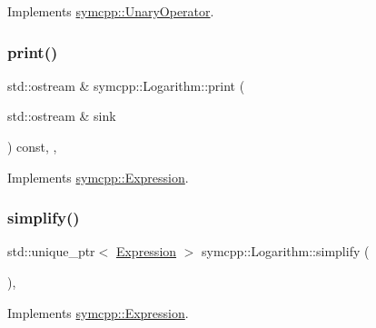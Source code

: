 Implements \mbox{\hyperlink{classsymcpp_1_1UnaryOperator_a85de3214870cd72edc63ac1c221ddeee}{symcpp\+::\+Unary\+Operator}}.

\mbox{\label{classsymcpp_1_1Logarithm_a336bed1a474b338eabd6a258d527b65b}} 
\subsubsection{\texorpdfstring{print()}{print()}}
{\footnotesize\ttfamily std\+::ostream \& symcpp\+::\+Logarithm\+::print (\begin{DoxyParamCaption}\item[{std\+::ostream \&}]{sink }\end{DoxyParamCaption}) const\hspace{0.3cm}{\ttfamily [override]}, {\ttfamily [private]}, {\ttfamily [virtual]}}



Implements \mbox{\hyperlink{classsymcpp_1_1Expression_af37e13032a40f2da4d2866eaa8658049}{symcpp\+::\+Expression}}.

\mbox{\label{classsymcpp_1_1Logarithm_af771894e90cbe561e3eb2e9a9b32954b}} 
\subsubsection{\texorpdfstring{simplify()}{simplify()}}
{\footnotesize\ttfamily std\+::unique\+\_\+ptr$<$ \mbox{\hyperlink{classsymcpp_1_1Expression}{Expression}} $>$ symcpp\+::\+Logarithm\+::simplify (\begin{DoxyParamCaption}{ }\end{DoxyParamCaption})\hspace{0.3cm}{\ttfamily [override]}, {\ttfamily [virtual]}}



Implements \mbox{\hyperlink{classsymcpp_1_1Expression_ab1fa6e55eea0682250d013f28db26cd2}{symcpp\+::\+Expression}}.

\mbox{\label{classsymcpp_1_1Logarithm_ad3aa899567a080eeb41cb850de310178}} 
